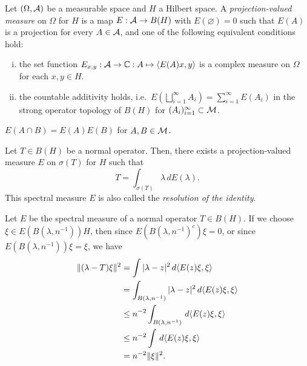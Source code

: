 \documentclass{../../large}
\begin{document}
\begin{prb}
Let $(\Omega,\mathcal{A})$ be a measurable space and $H$ a Hilbert space.
A \emph{projection-valued measure} on $\Omega$ for $H$ is a map $E:\mathcal{A}\to B(H)$ with $E(\varnothing)=0$ such that $E(A)$ is a projection for every $A\in\mathcal{A}$, and one of the following equivalent conditions hold:
\begin{enumerate}[(i)]
\item the set function $E_{x,y}:\mathcal{A}\to\mathbb{C}:A\mapsto\langle E(A)x,y\rangle$ is a complex measure on $\Omega$ for each $x,y\in H$.
\item the countable additivity holds, i.e.~$E(\bigsqcup_{i=1}^\infty A_i)=\sum_{i=1}^\infty E(A_i)$ in the strong operator topology of $B(H)$ for $(A_i)_{i=1}^\infty\subset\mathcal{M}$.
\end{enumerate}
\begin{parts}
\item $E(A\cap B)=E(A)E(B)$ for $A,B\in\mathcal{M}$.
\end{parts}
\end{prb}

\begin{prb}
Let $T\in B(H)$ be a normal operator.
Then, there exists a projection-valued measure $E$ on $\sigma(T)$ for $H$ such that
\[T=\int_{\sigma(T)}\lambda\,dE(\lambda).\]
This spectral measure $E$ is also called the \emph{resolution of the identity}.
\end{prb}


Let $E$ be the spectral measure of a normal operator $T\in B(H)$.
If we choose $\xi\in E(B(\lambda,n^{-1}))H$, then since $E(B(\lambda,n^{-1})^c)\xi=0$, or since $E(B(\lambda,n^{-1}))\xi=\xi$, we have
\begin{align*}
\|(\lambda-T)\xi\|^2
&=\int|\lambda-z|^2\,d\langle E(z)\xi,\xi\rangle\\
&=\int_{B(\lambda,n^{-1})}|\lambda-z|^2\,d\langle E(z)\xi,\xi\rangle\\
&\le n^{-2}\int_{B(\lambda,n^{-1})}\,d\langle E(z)\xi,\xi\rangle\\
&\le n^{-2}\int\,d\langle E(z)\xi,\xi\rangle\\
&=n^{-2}\|\xi\|^2.
\end{align*}
\end{document}

